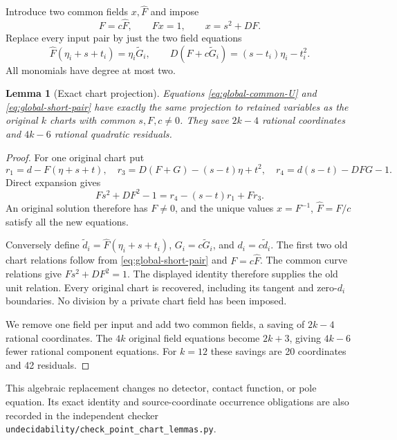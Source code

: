 \documentclass[11pt]{article}
\newtheorem{lemma}[theorem]{Lemma}
\begin{document}
Introduce two common fields \(x,\widehat F\)
and impose
\begin{equation}\label{eq:global-common-U}
               F=c\widehat F,\qquad
               Fx=1,\qquad x=s^2+DF .
\end{equation}
Replace every input pair by just the
two field equations
\begin{equation}\label{eq:global-short-pair}
 \widehat F(\eta_i+s+t_i)=\eta_i\widetilde G_i,\qquad
 D(F+c\widetilde G_i)=(s-t_i)\eta_i-t_i^2 .
\end{equation}
All monomials have degree at most two.

\begin{lemma}[Exact chart projection]\label{lem:global-short-pair}
Equations \eqref{eq:global-common-U} and
\eqref{eq:global-short-pair} have exactly
the same projection to retained variables
as the original \(k\) charts with common
\(s,F,c\ne0\). They save \(2k-4\)
rational coordinates and \(4k-6\)
rational quadratic residuals.
\end{lemma}
\begin{proof}
For one original chart put
\[
 r_1=d-F(\eta+s+t),\quad
 r_3=D(F+G)-(s-t)\eta+t^2,\quad
 r_4=d(s-t)-DFG-1.
\]
Direct expansion gives
\[
                  Fs^2+DF^2-1
                   =r_4-(s-t)r_1+Fr_3 .
\]
An original solution therefore has
\(F\ne0\), and the unique values
\(x=F^{-1}\), \(\widehat F=F/c\)
satisfy all the new equations.

Conversely define
\(\widetilde d_i=\widehat F(\eta_i+s+t_i)\),
\(G_i=c\widetilde G_i\), and
\(d_i=c\widetilde d_i\).
The first two old chart relations follow
from \eqref{eq:global-short-pair} and
\(F=c\widehat F\). The common curve
relations give \(Fs^2+DF^2=1\).
The displayed identity therefore supplies
the old unit relation. Every original
chart is recovered, including its
tangent and zero-\(d_i\) boundaries.
No division by a private chart field
has been imposed.

We remove one field per input and add
two common fields, a saving of \(2k-4\)
rational coordinates. The \(4k\)
original field equations become
\(2k+3\), giving \(4k-6\) fewer
rational component equations.
For \(k=12\) these savings are
20 coordinates and 42 residuals.
\end{proof}

This algebraic replacement changes no
detector, contact function, or pole
equation. Its exact identity and
source-coordinate occurrence obligations
are also recorded in the independent
checker
\nolinkurl{undecidability/check_point_chart_lemmas.py}.
\end{document}
